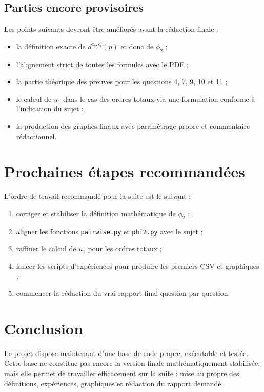 \documentclass[11pt,a4paper]{article}
\begin{document}
\subsection{Parties encore provisoires}

Les points suivants devront \^etre am\'elior\'es avant la r\'edaction finale :
\begin{itemize}[leftmargin=*]
    \item la d\'efinition exacte de \(d^{c_k,c_l}(p)\) et donc de \(\phi_2\) ;
    \item l'alignement strict de toutes les formules avec le PDF ;
    \item la partie th\'eorique des preuves pour les questions 4, 7, 9, 10 et 11 ;
    \item le calcul de \(u_1\) dans le cas des ordres totaux via une formulation conforme \`a l'indication du sujet ;
    \item la production des graphes finaux avec param\'etrage propre et commentaire r\'edactionnel.
\end{itemize}

\section{Prochaines \'etapes recommand\'ees}

L'ordre de travail recommand\'e pour la suite est le suivant :
\begin{enumerate}[leftmargin=*]
    \item corriger et stabiliser la d\'efinition math\'ematique de \(\phi_2\) ;
    \item aligner les fonctions \texttt{pairwise.py} et \texttt{phi2.py} avec le sujet ;
    \item raffiner le calcul de \(u_1\) pour les ordres totaux ;
    \item lancer les scripts d'exp\'eriences pour produire les premiers CSV et graphiques ;
    \item commencer la r\'edaction du vrai rapport final question par question.
\end{enumerate}

\section{Conclusion}

Le projet dispose maintenant d'une base de code propre, ex\'ecutable et test\'ee. Cette base ne constitue pas encore la version finale math\'ematiquement stabilis\'ee, mais elle permet de travailler efficacement sur la suite : mise au propre des d\'efinitions, exp\'eriences, graphiques et r\'edaction du rapport demand\'e.
\end{document}
